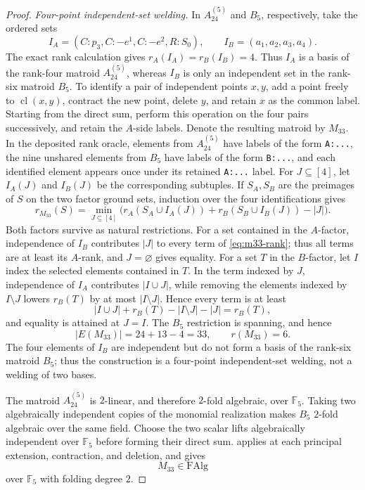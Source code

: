 \documentclass[11pt]{article}
\theoremstyle{definition}
\newcommand{\cl}{\operatorname{cl}}
\newcommand{\FAlg}{\mathrm{FAlg}}
\begin{document}
\begin{proof}
\emph{Four-point independent-set welding.}
In $A_{24}^{(5)}$ and $B_5$, respectively, take the ordered sets
\[
I_A=(C:p_3,C:{-}e^1,C:{-}e^2,R:S_0),
\qquad
I_B=(a_1,a_2,a_3,a_4).
\]
The exact rank calculation gives $r_A(I_A)=r_B(I_B)=4$.  Thus $I_A$ is a basis of the rank-four matroid $A_{24}^{(5)}$, whereas $I_B$ is only an independent set in the rank-six matroid $B_5$.  To identify a pair of independent points $x,y$, add a point freely to $\cl(x,y)$, contract the new point, delete $y$, and retain $x$ as the common label.  Starting from the direct sum, perform this operation on the four pairs successively, and retain the $A$-side labels.  Denote the resulting matroid by $M_{33}$.  In the deposited rank oracle, elements from $A_{24}^{(5)}$ have labels of the form \texttt{A:...}, the nine unshared elements from $B_5$ have labels of the form \texttt{B:...}, and each identified element appears once under its retained \texttt{A:...} label.  For $J\subseteq[4]$, let $I_A(J)$ and $I_B(J)$ be the corresponding subtuples.  If $S_A,S_B$ are the preimages of $S$ on the two factor ground sets, induction over the four identifications gives
\begin{equation}\label{eq:m33-rank}
r_{M_{33}}(S)=
\min_{J\subseteq[4]}
\bigl(r_A(S_A\cup I_A(J))+r_B(S_B\cup I_B(J))-|J|\bigr).
\end{equation}
Both factors survive as natural restrictions.  For a set contained in the $A$-factor, independence of $I_B$ contributes $|J|$ to every term of \eqref{eq:m33-rank}; thus all terms are at least its $A$-rank, and $J=\varnothing$ gives equality.  For a set $T$ in the $B$-factor, let $I$ index the selected elements contained in $T$.  In the term indexed by $J$, independence of $I_A$ contributes $|I\cup J|$, while removing the elements indexed by $I\setminus J$ lowers $r_B(T)$ by at most $|I\setminus J|$.  Hence every term is at least
\[
|I\cup J|+r_B(T)-|I\setminus J|-|J|=r_B(T),
\]
and equality is attained at $J=I$.  The $B_5$ restriction is spanning, and hence
\[
|E(M_{33})|=24+13-4=33,
\qquad r(M_{33})=6.
\]
The four elements of $I_B$ are independent but do not form a basis of the rank-six matroid $B_5$; thus the construction is a four-point independent-set welding, not a welding of two bases.

The matroid $A_{24}^{(5)}$ is $2$-linear, and therefore $2$-fold algebraic, over $\mathbb F_5$.  Taking two algebraically independent copies of the monomial realization makes $B_5$ $2$-fold algebraic over the same field.  Choose the two scalar lifts algebraically independent over $\mathbb F_5$ before forming their direct sum.   applies at each principal extension, contraction, and deletion, and gives
\[
M_{33}\in\FAlg
\]
over $\mathbb F_5$ with folding degree $2$.


\end{proof}
\end{document}

